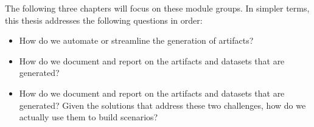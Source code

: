 The following three chapters will focus on these module groups. In
simpler terms, this thesis addresses the following questions in order:

\begin{itemize}
\item
  How do we automate or streamline the generation of artifacts?
\item
  How do we document and report on the artifacts and datasets that are
  generated?
\item
  How do we document and report on the artifacts and datasets that are
  generated? Given the solutions that address these two challenges, how
  do we actually use them to build scenarios?
\end{itemize}
